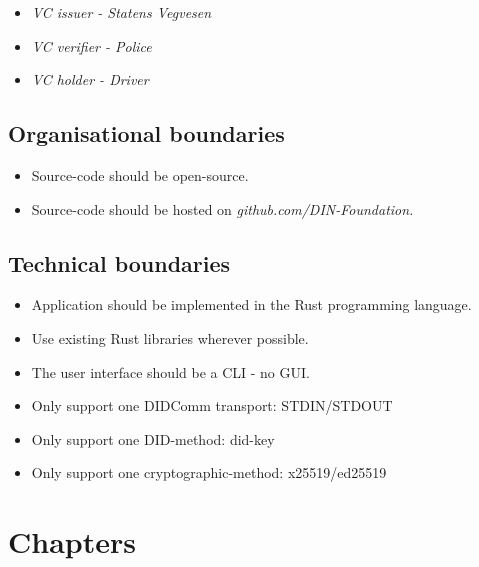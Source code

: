 \begin{itemize}
\tightlist
\item
  \emph{VC issuer - Statens Vegvesen}
\item
  \emph{VC verifier - Police}
\item
  \emph{VC holder - Driver}
\end{itemize}

\hypertarget{organisational-boundaries}{%
\subsection{Organisational boundaries}\label{organisational-boundaries}}

\begin{itemize}
\tightlist
\item
  Source-code should be open-source.
\item
  Source-code should be hosted on \emph{github.com/DIN-Foundation.}
\end{itemize}

\hypertarget{technical-boundaries}{%
\subsection{Technical boundaries}\label{technical-boundaries}}

\begin{itemize}
\tightlist
\item
  Application should be implemented in the Rust programming language.
\item
  Use existing Rust libraries wherever possible.
\item
  The user interface should be a CLI - no GUI.
\item
  Only support one DIDComm transport: STDIN/STDOUT
\item
  Only support one DID-method: did-key
\item
  Only support one cryptographic-method: x25519/ed25519
\end{itemize}



\pagebreak



\hypertarget{chapters}{%
\section{Chapters}\label{chapters}}

